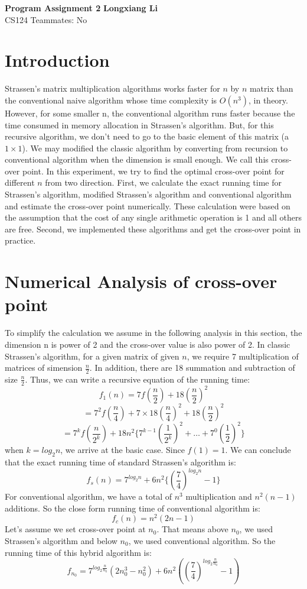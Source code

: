 \documentclass[a4paper, 11pt]{article}
\begin{document}
\noindent
\large\textbf{Program Assignment 2} \hfill \textbf{Longxiang Li} \\
\normalsize CS124 \hfill Teammates: No \\

\section*{Introduction}
Strassen's matrix multiplication algorithms works faster for $n$ by $n$ matrix than the conventional naive algorithm whose time complexity is $O(n^3)$, in theory. However, for some smaller n, the conventional algorithm runs faster because the time consumed in memory allocation in Strassen's algorithm. But, for this recursive algorithm, we don't need to go to the basic element of this matrix (a $1\times1$). We may modified the classic algorithm by converting from recursion to conventional algorithm when the dimension is small enough. We call this cross-over point. In this experiment, we try to find the optimal cross-over point for different $n$ from two direction. First, we calculate the exact running time for Strassen's algorithm, modified Strassen's algorithm and conventional algorithm and estimate the cross-over point numerically. These calculation were based on the assumption that the cost of any single arithmetic operation is 1 and all others are free. Second, we implemented these algorithms and get the cross-over point in practice.
\section*{Numerical Analysis of cross-over point}
To simplify the calculation we assume in the following analysis in this section, the dimension n is power of 2 and the cross-over value is also power of 2. In classic Strassen's algorithm, for a given matrix of given $n$, we require 7 multiplication of matrices of simension $\frac{n}{2}$. In addition, there are 18 summation and subtraction of size $\frac{n}{2}$. Thus, we can write a recursive equation of the running time:
\[{f_1}(n)=7f(\frac{n}{2})+18(\frac{n}{2})^2\] 
\[=7^2f(\frac{n}{4})+7\times18 (\frac{n}{4})^2+18(\frac{n}{2})^2\] 
\[=7^kf(\frac{n}{2^k})+18n^2\{7^{k-1}(\frac{1}{2^k})^2+\dots+7^0(\frac{1}{2})^2\}\]
when $k=log_2{n}$, we arrive at the basic case. Since $f(1)=1$. We can conclude that the exact running time of standard Strassen's algorithm is:
\[f_s(n)=7^{log_2{n}}+6n^2\{(\frac{7}{4})^{log_2{n}}-1\}\]
For conventional algorithm, we have a total of $n^3$ multiplication and $n^2(n-1)$ additions. So the close form running time of conventional algorithm is:
\[f_c(n)=n^2(2n-1)\]
Let's assume we set cross-over point at $n_0$. That means above $n_0$, we used Strassen's algorithm and below $n_0$, we used conventional algorithm. So the running time of this hybrid algorithm is:
\[f_{n_0}=7^{log_2{\frac{n}{n_0}}}(2n_0^3-n_0^2)+6n^2((\frac{7}{4})^{log_2{\frac{n}{n_0}}}-1)\]
\end{document}
